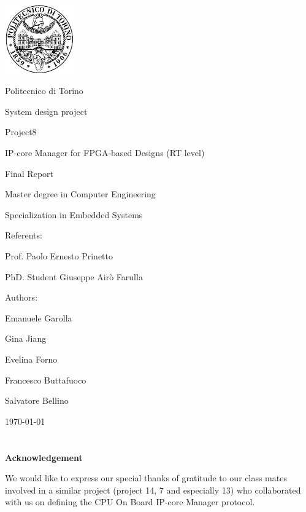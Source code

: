 \documentclass[12pt,  english, makeidx, a4paper, titlepage, oneside]{book}
\begin{document}
\frontmatter
\begin{titlepage}
\vspace{0cm}
\centerline{
\includegraphics[width=3cm]{./logopoli}} 
\vspace{0.5cm}
\centerline{\LARGE Politecnico di Torino}
\vspace{2cm}
\centerline{\Huge\sf System design project}
\vspace{1cm}
\centerline{\huge \sf Project8 }
\bigskip
\centerline{\huge\sf IP-core Manager for FPGA-based Designs (RT level)}
\bigskip
\centerline{\huge\sf Final Report}
\vspace{1.5cm}
\centerline{\Large Master degree in Computer Engineering}
\centerline{\Large Specialization in Embedded Systems}
\bigskip
\vspace{0.5cm}
%
\centerline{\large Referents: }
\centerline{\large Prof. Paolo Ernesto Prinetto}
\centerline{\large PhD. Student Giuseppe Air\`{o} Farulla}
\bigskip
\vspace{0.5cm}
%
%
\centerline{\large Authors:}
\bigskip
%
%
\centerline{\large Emanuele Garolla}
\centerline{\large Gina Jiang}
\centerline{\large Evelina Forno}
\centerline{\large Francesco Buttafuoco}
\centerline{\large Salvatore Bellino}

%
\vspace{1.5cm}
\centerline{\large \monthyeardate\today}
\end{titlepage}
 
\newenvironment{acknowledgements}%
{\cleardoublepage\thispagestyle{empty}\null\vfill\begin{center}%
		\bfseries\textbf{ \huge Acknowledgements}\end{center}}%
{\vfill\null}

\section*{}
\bigskip
\bigskip
\begin{center}
	{\huge \textbf{Acknowledgement}}
\end{center}
\bigskip
We would like to express our special thanks of gratitude to our class mates involved in a similar project (project 14, 7 and especially 13) who collaborated with us on defining the CPU On Board IP-core Manager protocol.
\end{document}
